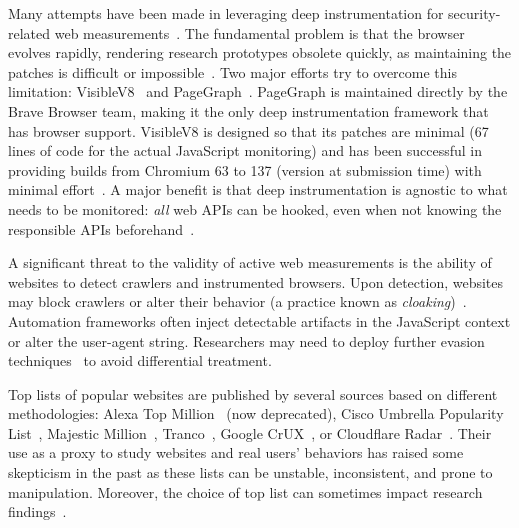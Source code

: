  Many attempts have been made in leveraging deep instrumentation for security-related web measurements~\cite{neasbittWebCapsuleLightweightForensic2015,liJSgraphEnablingReconstruction2018, acarFPDetectiveDustingWeb2013, IncontextStoreIncontext1998, chenMystiqueUncoveringInformation2018}. The fundamental problem is that the browser evolves rapidly, rendering research prototypes obsolete quickly, as maintaining the patches is difficult or impossible~\cite{chenMystiqueUncoveringInformation2018}.  
Two major efforts try to overcome this limitation: VisibleV8~\cite{jueckstockVisibleV8InbrowserMonitoring2019} and PageGraph~\cite{bravePageGraph,braveBravePagegraphcrawl2025}.
%
PageGraph is maintained directly by the Brave Browser team, making it the only deep instrumentation framework that has browser support. 
%
VisibleV8 is designed so that its patches are minimal (67 lines of code for the actual JavaScript monitoring) and has been successful in providing builds from Chromium 63 to 137 (version at submission time) with minimal effort~\cite{wspratncsuWsprncsuVisiblev82025, jueckstockVisibleV8InbrowserMonitoring2019}. A major benefit is that deep instrumentation is agnostic to what needs to be monitored: \textit{all} web APIs can be hooked, even when not knowing the responsible APIs beforehand~\cite{suAutomaticDiscoveryEmerging2023}.

A significant threat to the validity of active web measurements is the ability of websites to detect crawlers and instrumented browsers. Upon detection, websites may block crawlers or alter their behavior (a practice known as \textit{cloaking})~\cite{invernizzi2016cloak}. Automation frameworks often inject detectable artifacts in the JavaScript context or alter the user-agent string. Researchers may need to deploy further evasion techniques~\cite{berstendPuppeteerextrapluginstealth2023} to avoid differential treatment.

 Top lists of popular websites are published by several sources based on different methodologies: Alexa Top Million~\cite{amazonAlexa} (now deprecated), Cisco Umbrella Popularity List~\cite{ciscoCiscoUmbrellaPopularity}, Majestic Million~\cite{majesticMajesticMillion}, Tranco~\cite{lepochatTrancoResearchOrientedTop2019}, Google CrUX~\cite{googleChromeUXReport2017}, or Cloudflare Radar~\cite{cloudflareCloudflareRadar2025}. 
%
Their use as a proxy to study websites and real users' behaviors has raised some skepticism in the past as these lists can be unstable, inconsistent, and prone to manipulation. Moreover, the choice of top list can sometimes impact research findings~\cite{lepochatTrancoResearchOrientedTop2019,ruthTopplingTopLists2022}.

